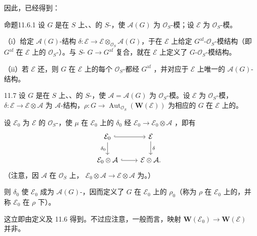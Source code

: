 因此，已经得到：
\begin{SGAresult}{命题}{11.6.1}
设 $G$ 是在 $S$ 上、、的 $S$-，使 $\mathcal A(G)$ 为 $\mathcal O_S$-模；设 $\mathcal E$ 为 $\mathcal O_S$-模。

（i）给定 $\mathcal A(G)$-结构 $\delta:\mathcal E\to\mathcal E\otimes_{\mathcal O_S}\mathcal A(G)$，于在 $\mathcal E$ 上给定 $G^{\mathrm{af}}$-$\mathcal O_S$-模结构（即 $G^{\mathrm{af}}$ 在 $\mathcal E$ 上的 $\mathcal O_S$-）。与 $S$- $G\to G^{\mathrm{af}}$ 复合，就在 $\mathcal E$ 上定义了 $G$-$\mathcal O_S$-模结构。

（ii）若 $\mathcal E$ 还，则 $G$ 在 $\mathcal E$ 上的每个 $\mathcal O_S$-都经 $G^{\mathrm{af}}$ ，并对应于 $\mathcal E$ 上唯一的 $\mathcal A(G)$-结构。
\end{SGAresult}

\begin{SGAresult}{}{11.7}
设 $G$ 是在 $S$ 上、、的 $S$-，使 $\mathcal A=\mathcal A(G)$ 为 $\mathcal O_S$-模。设 $\mathcal E$ 为 $\mathcal O_S$-模，$\delta:\mathcal E\to\mathcal E\otimes\mathcal A$ 为 $\mathcal A$-结构，$\rho:G\to\operatorname{Aut}_{\mathcal O_S}(\mathbf W(\mathcal E))$ 为相应的 $G$ 在 $\mathcal E$ 上的。

设 $\mathcal E_0$ 为 $\mathcal E$ 的 $\mathcal O_S$-，使 $\mu$ 在 $\mathcal E_0$ 上的 $\delta_0$ 经 $\mathcal E_0\to\mathcal E_0\otimes\mathcal A$ ，即有
\[
\begin{tikzcd}
\mathcal E_0\arrow[r,hook]\arrow[d,"\delta_0"']&\mathcal E\arrow[d,"\delta"]\\
\mathcal E_0\otimes\mathcal A\arrow[r,hook]&\mathcal E\otimes\mathcal A.
\end{tikzcd}
\]
（注意，因 $\mathcal A$ 在 $\mathcal O_S$ 上， $\mathcal E_0\otimes\mathcal A\to\mathcal E\otimes\mathcal A$ 为。）

则 $\delta_0$ 使 $\mathcal E_0$ 成为 $\mathcal A(G)$-，因而定义了 $G$ 在 $\mathcal E_0$ 上的 $\rho_0$（称为 $\rho$ 在 $\mathcal E_0$ 上的，并称 $\mathcal E_0$ 在 $\rho$ 下）。
\end{SGAresult}
这立即由定义及 11.6 得到。不过应注意，一般而言，映射 $\mathbf W(\mathcal E_0)\to\mathbf W(\mathcal E)$ 并非。


